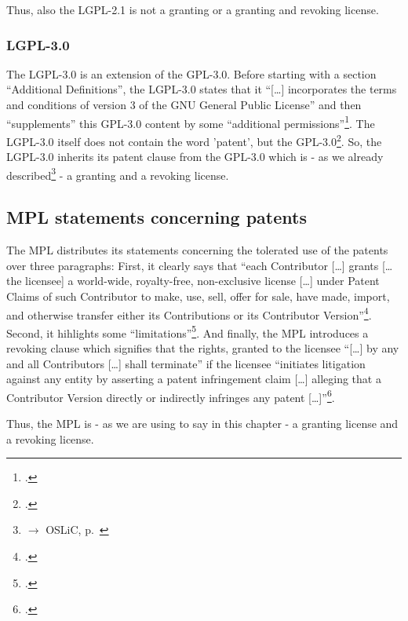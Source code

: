 Thus, also the LGPL-2.1 is not a granting or a granting and revoking license.

\subsubsection {LGPL-3.0}\label{subsec:Lgpl30PatentClause}

The LGPL-3.0 is an extension of the GPL-3.0. Before starting with a section
\enquote{Additional Definitions}, the LGPL-3.0 states that it \enquote{[\ldots]
incorporates the terms and conditions of version 3 of the GNU General Public
License} and then \enquote{supplements} this GPL-3.0 content by some
\enquote{additional permissions}\footcite[cf.][\nopage
wp]{Lgpl30OsiLicense2007a}. The LGPL-3.0 itself does not contain the word
'patent', but the GPL-3.0\footcite[cf.][\nopage wp.\ §11]{Gpl30OsiLicense2007a}.
So, the LGPL-3.0 inherits its patent clause from the GPL-3.0 which is - as we
already described\footnote{$\rightarrow$ OSLiC, p.\
\pageref{subsec:Gpl30PatentClause}} - a granting and a revoking license.
 
\subsection{MPL statements concerning patents}\label{subsec:MplPatentClause}

The MPL distributes its statements concerning the tolerated use of the patents
over three paragraphs: First, it clearly says that \enquote{each Contributor
[\ldots] grants [\ldots the licensee] a world-wide, royalty-free, non-exclusive
license [\ldots] under Patent Claims of such Contributor to make, use, sell,
offer for sale, have made, import, and otherwise transfer either its
Contributions or its Contributor Version}\footcite[cf.][\nopage wp.\ §2.1, esp.
§2.1.b]{Mpl20OsiLicense2013a}. Second, it hihlights some
\enquote{limitations}\footcite[cf.][\nopage wp.\ §2.1, esp.
§2.3]{Mpl20OsiLicense2013a}. And finally, the MPL introduces a revoking clause
which signifies that the rights, granted to the licensee \enquote{[\ldots] by
any and all Contributors [\ldots] shall terminate} if the licensee
\enquote{initiates litigation against any entity by asserting a patent
infringement claim [\ldots] alleging that a Contributor Version directly or
indirectly infringes any patent [\ldots]}\footcite[cf.][\nopage wp.\
§5.2]{Mpl20OsiLicense2013a}.

Thus, the MPL is - as we are using to say in this chapter - a granting license
and a revoking license.

